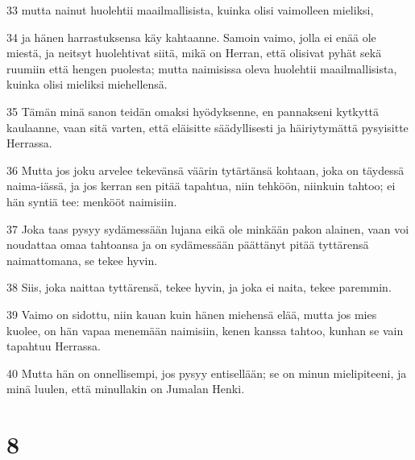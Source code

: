 \par 33 mutta nainut huolehtii maailmallisista, kuinka olisi vaimolleen mieliksi,
\par 34 ja hänen harrastuksensa käy kahtaanne. Samoin vaimo, jolla ei enää ole miestä, ja neitsyt huolehtivat siitä, mikä on Herran, että olisivat pyhät sekä ruumiin että hengen puolesta; mutta naimisissa oleva huolehtii maailmallisista, kuinka olisi mieliksi miehellensä.
\par 35 Tämän minä sanon teidän omaksi hyödyksenne, en pannakseni kytkyttä kaulaanne, vaan sitä varten, että eläisitte säädyllisesti ja häiriytymättä pysyisitte Herrassa.
\par 36 Mutta jos joku arvelee tekevänsä väärin tytärtänsä kohtaan, joka on täydessä naima-iässä, ja jos kerran sen pitää tapahtua, niin tehköön, niinkuin tahtoo; ei hän syntiä tee: menkööt naimisiin.
\par 37 Joka taas pysyy sydämessään lujana eikä ole minkään pakon alainen, vaan voi noudattaa omaa tahtoansa ja on sydämessään päättänyt pitää tyttärensä naimattomana, se tekee hyvin.
\par 38 Siis, joka naittaa tyttärensä, tekee hyvin, ja joka ei naita, tekee paremmin.
\par 39 Vaimo on sidottu, niin kauan kuin hänen miehensä elää, mutta jos mies kuolee, on hän vapaa menemään naimisiin, kenen kanssa tahtoo, kunhan se vain tapahtuu Herrassa.
\par 40 Mutta hän on onnellisempi, jos pysyy entisellään; se on minun mielipiteeni, ja minä luulen, että minullakin on Jumalan Henki.

\chapter{8}

